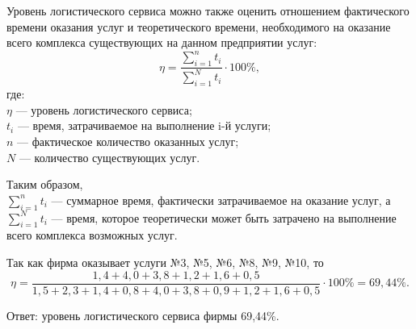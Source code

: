 Уровень логистического сервиса можно также оценить отношением фактического времени оказания услуг и теоретического времени, необходимого на оказание всего комплекса существующих на данном предприятии услуг:
\[ \eta = \dfrac{\sum\limits_{i=1}^{n} t_i}{\sum\limits_{i=1}^{N} t_i} \cdot 100\%,\]
где: \\
$\eta$ --- уровень логистического сервиса;
\\
$t_i$ --- время, затрачиваемое на выполнение i-й услуги;
\\
$n$ --- фактическое количество оказанных услуг;
\\
$N$ --- количество существующих услуг.

Таким образом, 
\\
$\sum\limits_{i=1}^{n} t_i$ --- суммарное время, фактически затрачиваемое на оказание услуг, а 
\\
$\sum\limits_{i=1}^{N} t_i$ --- время, которое теоретически может быть затрачено на выполнение всего комплекса возможных услуг.

Так как фирма оказывает услуги №3, №5, №6, №8, №9, №10, то
\[ \eta = \dfrac{1,4+4,0+3,8+1,2+1,6+0,5}{1,5+2,3+1,4+0,8+4,0+3,8+0,9+1,2+1,6+0,5} \cdot 100\% = 69,44\%. \]

Ответ: уровень логистического сервиса фирмы 69,44\%.